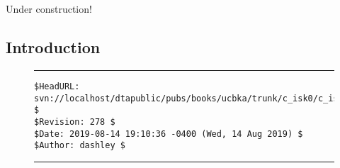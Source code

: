 
\chapter{\ciskzerolongtitle{}}

\label{cisk0}

                     {Under construction!}

\section{Introduction}



\vfill
\noindent\begin{figure}[!b]
\noindent\rule[-0.25in]{\textwidth}{1pt}
\begin{tiny}
\begin{verbatim}
$HeadURL: svn://localhost/dtapublic/pubs/books/ucbka/trunk/c_isk0/c_isk0.tex $
$Revision: 278 $
$Date: 2019-08-14 19:10:36 -0400 (Wed, 14 Aug 2019) $
$Author: dashley $
\end{verbatim}
\end{tiny}
\noindent\rule[0.25in]{\textwidth}{1pt}
\end{figure}
%
